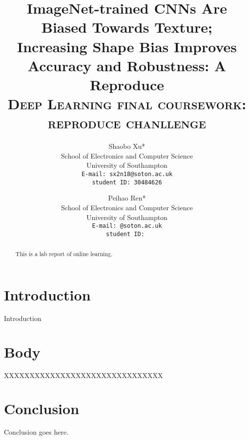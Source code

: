 \documentclass[10pt,twocolumn,letterpaper]{article}
\begin{document}
\title{ImageNet-trained CNNs Are Biased Towards Texture; Increasing Shape Bias Improves Accuracy and Robustness: A Reproduce\\
\textmd{\textsc{\large Deep Learning final coursework: reproduce chanllenge}}}

\author{
Shaobo Xu*\\
School of Electronics and Computer Science\\
University of Southampton\\
{\tt\small E-mail: sx2n18@soton.ac.uk}\\
{\tt\small student ID: 30484626}
\and
Peihao Ren*\\
School of Electronics and Computer Science\\
University of Southampton\\
{\tt\small E-mail: @soton.ac.uk}\\
{\tt\small student ID: }
}

\maketitle


\begin{abstract}
This is a lab report of online learning.
\end{abstract}

\section{Introduction}

Introduction\cite{geirhos2018imagenet}

\section{Body}

XXXXXXXXXXXXXXXXXXXXXXXXXXXXXXX\cite{geirhos2018imagenet}

\section{Conclusion}

Conclusion goes here.\cite{geirhos2018imagenet}

{\small




}
\end{document}
